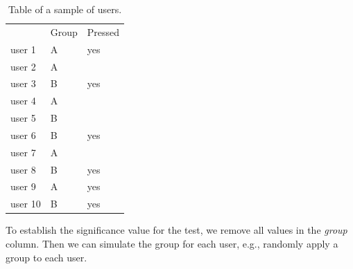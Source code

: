 \begin{table}[H]
  \centering
\begin{tabular}{|l|l|l|}
\cline{1-3} 
        & Group & Pressed \\\cline{1-3} 
user 1  & A     & yes     \\\cline{1-3} 
user 2  & A     &         \\\cline{1-3} 
user 3  & B     & yes     \\\cline{1-3} 
user 4  & A     &         \\\cline{1-3} 
user 5  & B     &         \\\cline{1-3} 
user 6  & B     & yes     \\\cline{1-3} 
user 7  & A     &         \\\cline{1-3} 
user 8  & B     & yes     \\\cline{1-3} 
user 9  & A     & yes     \\\cline{1-3} 
user 10 & B     & yes     \\\cline{1-3}  
\end{tabular}
\caption{Table of a sample of users.}
\label{tab:ab}
\end{table}

To establish the significance value for the test, we remove all values in the \textit{group} column. Then we can simulate the group for each user, e.g., randomly apply a group to each user. 

